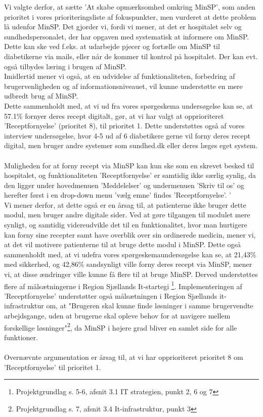 Vi valgte derfor, at sætte 'At skabe opmærksomhed omkring MinSP', som anden prioritet i vores prioriteringsliste af fokuspunkter, men vurderet at dette problem lå udenfor MinSP. Det gjorder vi, fordi vi mener, at det er hospitalet selv og sundhedspersonalet, der har opgaven med systematisk at informere om MinSP. Dette kan ske ved f.eks. at udarbejde pjecer og fortælle om MinSP til diabetikerne via mails, eller når de kommer til kontrol på hospitalet. Der kan evt. også tilbydes læring i brugen af MinSP.\\
Imidlertid mener vi også, at en udvidelse af funktionaliteten, forbedring af brugervenligheden og af informationsniveauet, vil kunne understøtte en mere udbredt brug af MinSP.\\
Dette sammenholdt med, at vi ud fra vores spørgeskema undersøgelse kan se, at 57.1\% fornyer deres recept digitalt, gør, at vi har valgt at opprioriteret 'Receptfornyelse' (prioritet 8), til prioritet 1. Dette understøttes også af vores interview undersøgelse, hvor 4-5 ud af 6 diabetikere gerne vil forny deres recept digital, men bruger andre systemer som sundhed.dk eller deres læges eget system.
\\\\
Muligheden for at forny recept via MinSP kan kun ske som en skrevet besked til hospitalet, og funktionaliteten 'Receptfornyelse' er samtidig ikke særlig synlig, da den ligger under hovedmenuen 'Meddelelser' og undermenuen 'Skriv til os' og herefter først i en drop-down menu 'vælg emne' findes 'Receptfornyelse'. '\\
Vi mener derfor, at dette også er en årsag til, at patienterne ikke bruger dette modul, men bruger andre digitale sider. Ved at gøre tilgangen til modulet mere synligt, og samtidig videreudvikle det til en funktionalitet, hvor man hurtigere kan forny sine recepter samt have overblik over sin ordinerede medicin, mener vi, at det vil motivere patienterne til at bruge dette modul i MinSP. Dette også sammenholdt med, at vi udefra vores spørgeskemaundersøgelse kan se, at 21,43\% med sikkerhed, og 42,86\% sandsynligt ville forny deres recept via MinSP, mener vi, at disse ændringer ville kunne få flere til at bruge MinSP. Derved understøttes flere af målsætningerne i Region Sjællands It-startegi \footnote{Projektgrundlag s. 5-6, afsnit 3.1 IT strategien, punkt 2, 6 og 7}. Implementeringen af 'Receptfornyelse' understøtter også målsætningen i Region Sjællands it-infrastruktur om, at "Brugeren skal kunne finde løsninger i samme brugervendte arbejdsgange, uden at brugerne skal opleve behov for at navigere mellem forskellige løsninger"\footnote{Projektgrundlag s. 7, afsnit 3.4 It-infrastruktur, punkt 3}, da MinSP i højere grad bliver en samlet side for alle funktioner. 
\\ \\
Overnævnte argumentation er årsag til, at vi har opprioriteret prioritet 8 om 'Receptfornyelse' til prioritet 1. 
